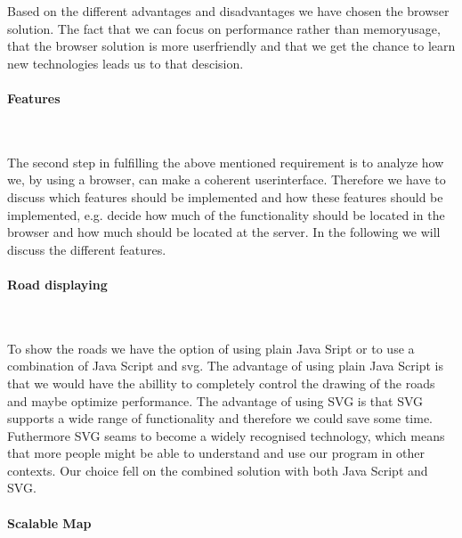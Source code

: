 \documentclass[a4paper,10pt,titlepage]{article}
\begin{document}
Based on the different advantages and disadvantages we have chosen the browser solution. The fact that we can focus on performance rather than memoryusage, that the browser solution is more userfriendly and that we get the chance to learn new technologies leads us to that descision.

\paragraph{Features}\mbox{}\

The second step in fulfilling the above mentioned requirement is to analyze how we, by using a browser, can make a coherent userinterface. Therefore we have to discuss which features should be implemented and how these features should be implemented, e.g. decide how much of the functionality should be located in the browser and how much should be located at the server. In the following we will discuss the different features.

\paragraph{Road displaying}\mbox{}\

To show the roads we have the option of using plain Java Sript or to use a combination of Java Script and svg. The advantage of using plain Java Script is that we would have the abillity to completely control the drawing of the roads and maybe optimize performance. The advantage of using SVG is that SVG supports a wide range of functionality and therefore we could save some time. Futhermore SVG seams to become a widely recognised technology, which means that more people might be able to understand and use our program in other contexts. Our choice fell on the combined solution with both Java Script and SVG. 
 
\paragraph{Scalable Map}\mbox{}\
\end{document}
